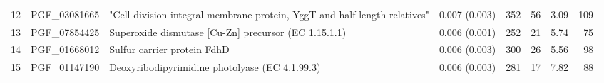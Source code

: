 \begin{tabular}{llllrrrr}
12 &  PGF\_03081665 &                     "Cell division integral membrane protein, YggT and half-length relatives" &        0.007 (0.003) &  352 &    56 &     3.09 &       109 \\
13 &  PGF\_07854425 &                                          Superoxide dismutase [Cu-Zn] precursor (EC 1.15.1.1) &        0.006 (0.001) &  252 &    21 &     5.74 &        75 \\
14 &  PGF\_01668012 &                                                                   Sulfur carrier protein FdhD &        0.006 (0.003) &  300 &    26 &     5.56 &        98 \\
15 &  PGF\_01147190 &                                                Deoxyribodipyrimidine photolyase (EC 4.1.99.3) &        0.006 (0.003) &  281 &    17 &     7.82 &        88 \\
\bottomrule
\end{tabular}
